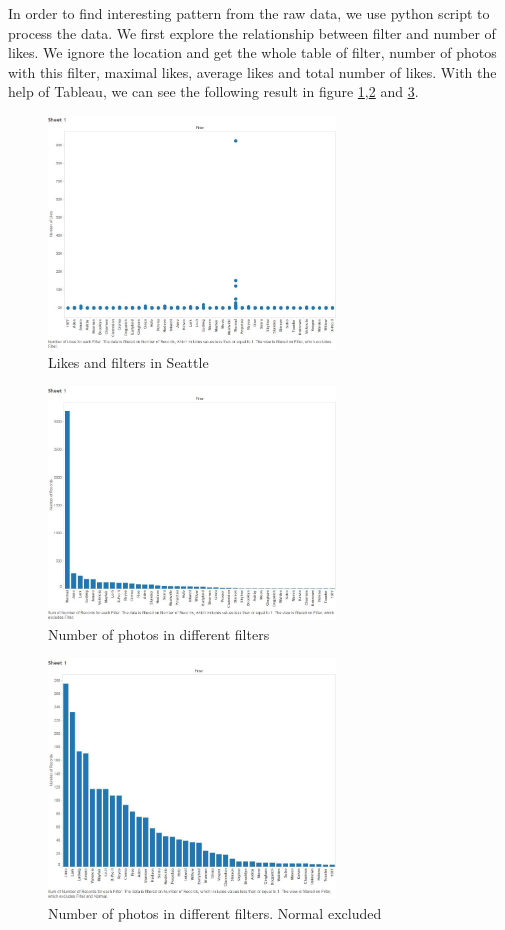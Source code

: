 \documentclass[conference]{acmsiggraph}
\begin{document}
In order to find interesting pattern from the raw data, we use python script to process the data. We first explore the relationship between filter and number of likes. We ignore the location and get the whole table of filter, number of photos with this filter, maximal likes, average likes and total number of likes.  With the help of Tableau, we can see the following result in figure \ref{like-filter},\ref{normal} and \ref{no-normal}.


\begin{figure}[ht]
  \centering
\includegraphics[width=3in]{images/sample_all_filter-like}
  \caption{Likes and filters in Seattle}
  \label{like-filter}
\end{figure}

\begin{figure}[ht]
  \centering
  \includegraphics[width=3in]{images/sample_all_number-filter_sorted}
  \caption{Number of photos in different filters}
  \label{normal}
\end{figure}
\begin{figure}[ht]
  \includegraphics[width=3in]{images/sample_all_number-filter_sorted_no-normal}
  \centering
  \caption{Number of photos in different filters. Normal excluded}
  \label{no-normal}
\end{figure}
\end{document}
